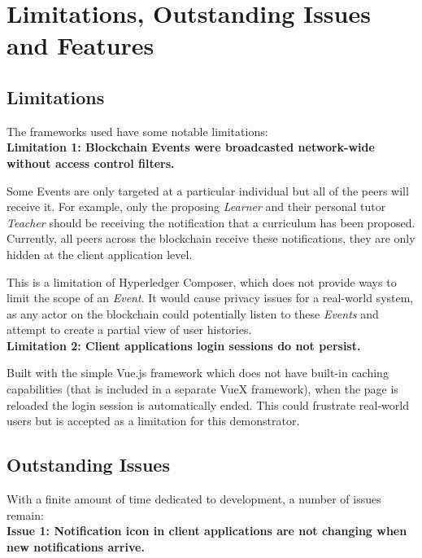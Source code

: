 \section{Limitations, Outstanding Issues and Features}

\subsection{Limitations}

The frameworks used have some notable limitations:
\vspace{0.25cm}\\
\textbf{Limitation 1: Blockchain Events were broadcasted network-wide without access control filters.}

Some Events are only targeted at a particular individual but all of the peers will receive it.
For example, only the proposing \textit{Learner} and their personal tutor \textit{Teacher} should 
be receiving the notification that a curriculum has been proposed. Currently, all peers across the 
blockchain receive these notifications, they are only hidden at the client application level.

This is a limitation of Hyperledger Composer, which does not provide ways to limit the scope of an \textit{Event}.
It would cause privacy issues for a real-world system, as any actor on the blockchain could potentially 
listen to these \textit{Events} and attempt to create a partial view of user histories.
\vspace{0.25cm}\\
\textbf{Limitation 2: Client applications login sessions do not persist.}

Built with the simple Vue.js framework which does not have built-in caching capabilities 
(that is included in a separate VueX framework), when the page is reloaded the login session 
is automatically ended. This could frustrate real-world users but is accepted as a limitation 
for this demonstrator.

\subsection{Outstanding Issues}

With a finite amount of time dedicated to development, a number of issues remain:
\vspace{0.25cm}\\
\textbf{Issue 1: Notification icon in client applications are not changing when new notifications arrive.}

